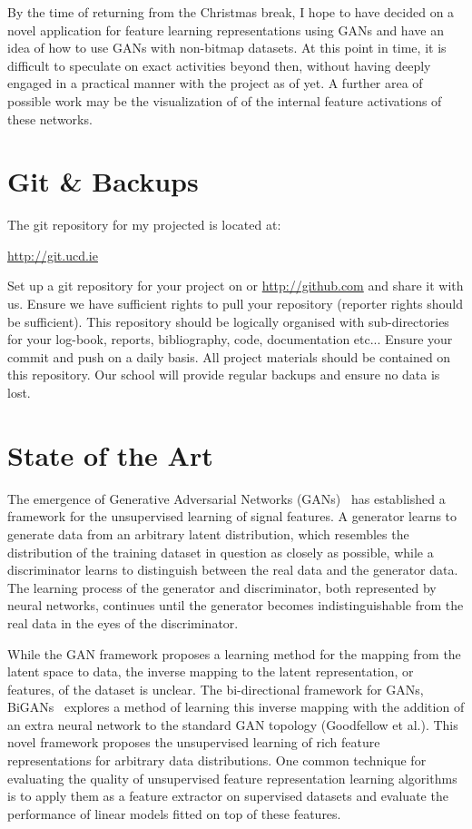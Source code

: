 \documentclass[]{monthly-report}
\begin{document}
By the time of returning from the Christmas break, I hope to have decided on a novel application for feature learning representations using GANs and have an idea of how to use GANs with non-bitmap datasets. At this point in time, it is difficult to speculate on exact activities beyond then, without having deeply engaged in a practical manner with the project as of yet.  A further area of possible work may be the visualization of of the internal feature activations of these networks.

\section{Git \& Backups}

The git repository for my projected is located at:

\url{http://git.ucd.ie}

Set up a git repository for your project on  or  \url{http://github.com} and share it with us. Ensure we have sufficient rights to pull your repository (reporter rights should be sufficient). This repository should be logically organised with sub-directories for your log-book, reports, bibliography, code, documentation etc... Ensure your commit and push on a daily basis. All project materials should be contained on this repository. Our school will provide regular backups and ensure no data is lost.

\newpage

\section{State of the Art}

The emergence of Generative Adversarial Networks (GANs)~\cite{goodfellow_GAN_2014} has established a framework for the unsupervised learning of signal features. A generator learns to generate data from an arbitrary latent distribution, which resembles the distribution of the training dataset in question as closely as possible, while a discriminator learns to distinguish between the real data and the generator data. The learning process of the generator and discriminator, both represented by neural networks, continues until the generator becomes indistinguishable from the real data in the eyes of the discriminator.

While the GAN framework proposes a learning method for the mapping from the latent space to data, the inverse mapping to the latent representation, or features, of the dataset is unclear. The bi-directional framework for GANs, BiGANs~\cite{donahue2016bigan} explores a method of learning this inverse mapping with the addition of an extra neural network to the standard GAN topology (Goodfellow et al.). This novel framework proposes the unsupervised learning of rich feature representations for arbitrary data distributions. One common technique for evaluating the quality of unsupervised feature representation learning algorithms is to apply them as a feature extractor on supervised datasets and evaluate the performance of linear models fitted on top of these features.
\end{document}
